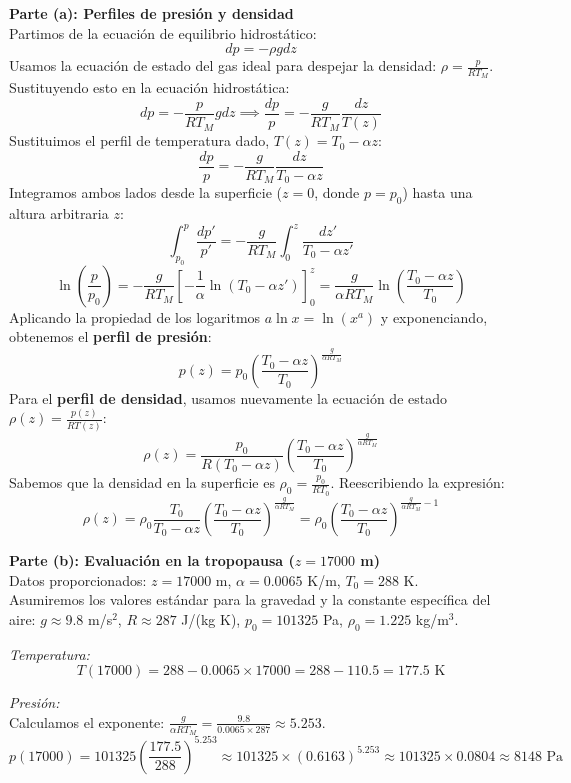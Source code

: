 \documentclass[a4paper]{article}
\begin{document}
\textbf{Parte (a): Perfiles de presión y densidad} \\
Partimos de la ecuación de equilibrio hidrostático:
$$ dp = -\rho g dz $$
Usamos la ecuación de estado del gas ideal para despejar la densidad: $\rho = \frac{p}{R T_M}$. Sustituyendo esto en la ecuación hidrostática:
$$ dp = -\frac{p}{R T_M} g dz \implies \frac{dp}{p} = -\frac{g}{R T_M} \frac{dz}{T(z)} $$
Sustituimos el perfil de temperatura dado, $T(z) = T_0 - \alpha z$:
$$ \frac{dp}{p} = -\frac{g}{R T_M} \frac{dz}{T_0 - \alpha z} $$
Integramos ambos lados desde la superficie ($z = 0$, donde $p = p_0$) hasta una altura arbitraria $z$:
$$ \int_{p_0}^{p} \frac{dp'}{p'} = -\frac{g}{R T_M} \int_{0}^{z} \frac{dz'}{T_0 - \alpha z'} $$
$$ \ln\left(\frac{p}{p_0}\right) = -\frac{g}{R T_M} \left[ -\frac{1}{\alpha} \ln(T_0 - \alpha z') \right]_0^z = \frac{g}{\alpha R T_M} \ln\left(\frac{T_0 - \alpha z}{T_0}\right) $$
Aplicando la propiedad de los logaritmos $a \ln x = \ln(x^a)$ y exponenciando, obtenemos el \textbf{perfil de presión}:
$$ p(z) = p_0 \left( \frac{T_0 - \alpha z}{T_0} \right)^{\frac{g}{\alpha R T_M}} $$
Para el \textbf{perfil de densidad}, usamos nuevamente la ecuación de estado $\rho(z) = \frac{p(z)}{R T(z)}$:
$$ \rho(z) = \frac{p_0}{R (T_0 - \alpha z)} \left( \frac{T_0 - \alpha z}{T_0} \right)^{\frac{g}{\alpha R T_M}} $$
Sabemos que la densidad en la superficie es $\rho_0 = \frac{p_0}{R T_0}$. Reescribiendo la expresión:
$$ \rho(z) = \rho_0 \frac{T_0}{T_0 - \alpha z} \left( \frac{T_0 - \alpha z}{T_0} \right)^{\frac{g}{\alpha R T_M}} = \rho_0 \left( \frac{T_0 - \alpha z}{T_0} \right)^{\frac{g}{\alpha R T_M} - 1} $$

\textbf{Parte (b): Evaluación en la tropopausa ($z = 17000$ m)} \\
Datos proporcionados: $z = 17000$ m, $\alpha = 0.0065$ K/m, $T_0 = 288$ K. \\
Asumiremos los valores estándar para la gravedad y la constante específica del aire: $g \approx 9.8$ m/s$^2$, $R \approx 287$ J/(kg K), $p_0 = 101325$ Pa, $\rho_0 = 1.225$ kg/m$^3$.

\textit{Temperatura:}
$$ T(17000) = 288 - 0.0065 \times 17000 = 288 - 110.5 = 177.5 \text{ K} $$

\textit{Presión:} \\
Calculamos el exponente: $\frac{g}{\alpha R T_M} = \frac{9.8}{0.0065 \times 287} \approx 5.253$.
$$ p(17000) = 101325 \left( \frac{177.5}{288} \right)^{5.253} \approx 101325 \times (0.6163)^{5.253} \approx 101325 \times 0.0804 \approx 8148 \text{ Pa} $$
\end{document}
